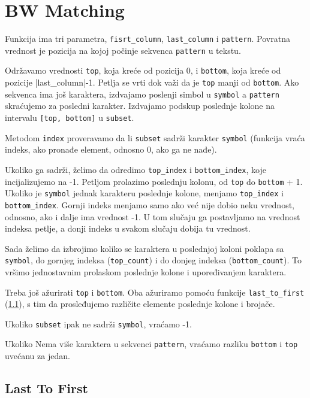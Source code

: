 \section{BW Matching}

Funkcija ima tri parametra, \texttt{fisrt\_column}, \texttt{last\_column} i \texttt{pattern}. Povratna vrednost je pozicija na kojoj počinje sekvenca \texttt{pattern} u tekstu.

Održavamo vrednosti \texttt{top}, koja kreće od pozicija 0, i \texttt{bottom}, koja kreće od pozicije |last\_column|-1. Petlja se vrti dok važi da je \texttt{top} manji od \texttt{bottom}. Ako sekvenca ima još karaktera, izdvajamo poslenji simbol u \texttt{symbol} a \texttt{pattern} skraćujemo za posledni karakter. Izdvajamo podskup poslednje kolone na intervalu \texttt{[top, bottom]} u \texttt{subset}. 

Metodom \texttt{index} proveravamo da li \texttt{subset} sadrži karakter \texttt{symbol} (funkcija vraća indeks, ako pronađe element, odnosno 0, ako ga ne nađe). 

Ukoliko ga sadrži, želimo da odredimo \texttt{top\_index} i \texttt{bottom\_index}, koje incijalizujemo na -1. Petljom prolazimo poslednju kolonu, od \texttt{top} do \texttt{bottom} + 1. Ukoliko je \texttt{symbol} jednak karakteru poslednje kolone, menjamo \texttt{top\_index} i \texttt{bottom\_index}. Gornji indeks menjamo samo ako već nije dobio neku vrednost, odnosno, ako i dalje ima vrednost -1. U tom slučaju ga postavljamo na vrednost indeksa petlje, a donji indeks u svakom slučaju dobija tu vrednost.

Sada želimo da izbrojimo koliko se karaktera u poslednjoj koloni poklapa sa \texttt{symbol}, do gornjeg indeksa (\texttt{top\_count}) i do donjeg indeksa (\texttt{bottom\_count}). To vršimo jednostavnim prolaskom poslednje kolone i upoređivanjem karaktera.

Treba još ažurirati \texttt{top} i \texttt{bottom}. Oba ažuriramo pomoću funkcije \texttt{last\_to\_first} (\ref{lastToFirst}), s tim da prosleđujemo različite elemente poslednje kolone i brojače. 

Ukoliko \texttt{subset} ipak ne sadrži \texttt{symbol}, vraćamo -1.

Ukoliko Nema više karaktera u sekvenci \texttt{pattern}, vraćamo razliku \texttt{bottom} i \texttt{top} uvećanu za jedan.




\subsection{Last To First}
\label{lastToFirst}


